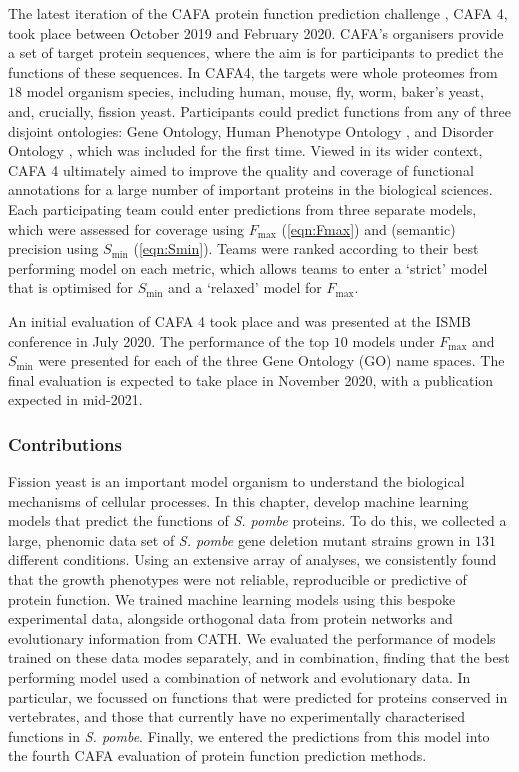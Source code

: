The latest iteration of the CAFA protein function prediction challenge \cite{Radivojac2013,Jiang2016,Zhou2019}, CAFA 4, took place between October 2019 and February 2020. CAFA's organisers provide a set of target protein sequences, where the aim is for participants to predict the functions of these sequences. In CAFA4, the targets were whole proteomes from $18$ model organism species, including human, mouse, fly, worm, baker's yeast, and, crucially, fission yeast. Participants could predict functions from any of three disjoint ontologies: Gene Ontology, Human Phenotype Ontology \cite{Kohler2019}, and Disorder Ontology \cite{Hatos2020}, which was included for the first time. Viewed in its wider context, CAFA 4 ultimately aimed to improve the quality and coverage of functional annotations for a large number of important proteins in the biological sciences. Each participating team could enter predictions from three separate models, which were assessed for coverage using $F_{\max}$ (\ref{eqn:Fmax}) and (semantic) precision using $S_{\min}$ (\ref{eqn:Smin}). Teams were ranked according to their best performing model on each metric, which allows teams to enter a `strict' model that is optimised for $S_{\min}$ and a `relaxed' model for $F_{\max}$.

An initial evaluation of CAFA 4 took place and was presented at the ISMB conference in July 2020. The performance of the top $10$ models under $F_{\max}$ and $S_{\min}$ were presented for each of the three Gene Ontology (GO) name spaces. The final evaluation is expected to take place in November 2020, with a publication expected in mid-2021.

\subsubsection{Contributions}

Fission yeast is an important model organism to understand the biological mechanisms of cellular processes.
In this chapter, develop machine learning models that predict the functions of \emph{S. pombe} proteins.
To do this, we collected a large, phenomic data set of \emph{S. pombe} gene deletion mutant strains grown in $131$ different conditions.
Using an extensive array of analyses, we consistently found that the growth phenotypes were not reliable, reproducible or predictive of protein function.
We trained machine learning models using this bespoke experimental data, alongside orthogonal data from protein networks and evolutionary information from CATH.
We evaluated the performance of models trained on these data modes separately, and in combination, finding that the best performing model used a combination of network and evolutionary data.
In particular, we focussed on functions that were predicted for proteins conserved in vertebrates, and those that currently have no experimentally characterised functions in \emph{S. pombe}.
Finally, we entered the predictions from this model into the fourth CAFA evaluation of protein function prediction methods.

